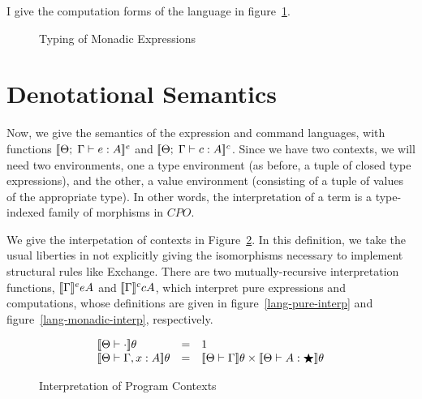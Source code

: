 I give the computation forms of the language in
figure~\ref{lang-typing-monadic}. 


\begin{figure}
\caption{Typing of Monadic Expressions}
\label{lang-typing-monadic}
\end{figure}

\section{Denotational Semantics}

Now, we give the semantics of the expression and command languages,
with functions $[\![{{\Theta};\;{\Gamma} \vdash {e} : {A}}]\!]^e$ and
$[\![{{\Theta};\;{\Gamma} \vdash {c} : {A}}]\!]^c$. Since we have two contexts, we will
need two environments, one a type environment (as before, a tuple of
closed type expressions), and the other, a value environment
(consisting of a tuple of values of the appropriate type). In other
words, the interpretation of a term is a type-indexed family of
morphisms in $CPO$.

We give the interpetation of contexts in
Figure~\ref{lang-context-interp}. In this definition, we take the
usual liberties in not explicitly giving the isomorphisms necessary to
implement structural rules like Exchange. There are two
mutually-recursive interpretation functions, $[\![{\Gamma}]\!]^e{e}{A}$
and $[\![{\Gamma}]\!]^c{c}{A}$, which interpret pure expressions and
computations, whose definitions are given in
figure~\ref{lang-pure-interp} and figure~\ref{lang-monadic-interp},
respectively.

\begin{figure}
\begin{displaymath}
  \begin{array}{lcl}
  \interp{\Theta \vdash \cdot}\theta & = & 1 \\
  \interp{\Theta \vdash \Gamma, x:A}\theta & = & 
       \interp{\Theta \vdash \Gamma}\theta 
       \times 
       \interp{\Theta \vdash A:\bigstar}\theta \\
  \end{array}
\end{displaymath}
\caption{Interpretation of Program Contexts}
\label{lang-context-interp}
\end{figure}

